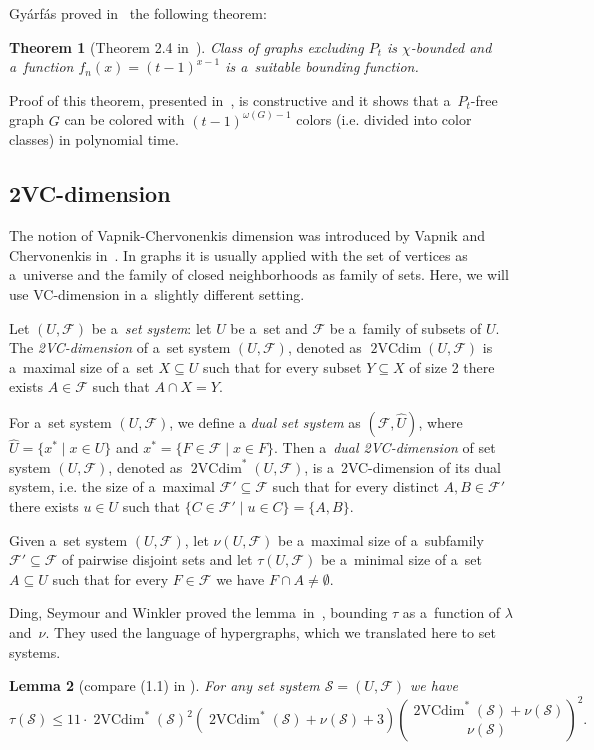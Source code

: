 \documentclass[11pt,a4paper]{article}
\DeclareMathOperator{\VC}{2VCdim}
\newtheorem{theorem}{Theorem}[section]
\newtheorem{lemma}[theorem]{Lemma}
\theoremstyle{definition}
\renewcommand{\varnothing}{\emptyset}
\begin{document}
Gyárfás proved in~\cite{chiBoundness} the following theorem:
\begin{theorem}[Theorem 2.4 in~\cite{chiBoundness}]\label{thm:Gyarfas_paths}
    Class of graphs excluding $P_t$ is $\chi$-bounded and a~function $f_n(x)= (t-1)^{x-1}$ is a~suitable bounding function. 
\end{theorem}

Proof of this theorem, presented in~\cite{chiBoundness}, is constructive and it shows that a~$P_t$-free graph $G$ can be colored with $(t-1)^{\omega(G)-1}$ colors (i.e. divided into color classes) in polynomial time.


\subsection{2VC-dimension}

The notion of  Vapnik-Chervonenkis dimension was introduced by Vapnik and Chervonenkis in~\cite{VC}. In graphs it is usually applied with the set of vertices as a~universe and the family of closed neighborhoods as family of sets. Here, we will use VC-dimension in a~slightly different setting. 

Let $(U, \mathcal{F})$ be a~{\it set system}: let $U$ be a~set and $\mathcal{F}$ be a~family of subsets of $U$. The {\it 2VC-dimension} of a~set system $(U,\mathcal{F})$, denoted as $\VC(U, \mathcal{F})$ is a~maximal size of a~set $X\subseteq U$ such that for every subset $Y\subseteq X$ of size 2 there exists $A\in\mathcal{F}$ such that $A\cap X = Y$. 

For a~set system $(U, \mathcal{F})$, we define a {\it dual set system} as $(\mathcal{F}, \widehat{U})$, where $\widehat{U} = \{x^*\mid x\in U\}$ and $x^* = \{F\in\mathcal{F}\mid x\in F\}$. Then a~{\it dual 2VC-dimension} of set system $(U,\mathcal{F})$, denoted as $\VC^*(U,\mathcal{F})$,  is a~2VC-dimension of its dual system, i.e. the size of a~maximal $\mathcal{F}'\subseteq \mathcal{F}$ such that for every distinct $A,B\in \mathcal{F}'$ there exists $u\in U$ such that $\{C\in \mathcal{F}'\mid u\in C\}=\{A,B\}$. 

Given a~set system $(U, \mathcal{F})$, let $\nu(U, \mathcal{F})$ be a~maximal size of a~subfamily $\mathcal{F}'\subseteq \mathcal{F}$ of pairwise disjoint sets and let $\tau(U, \mathcal{F})$ be a~minimal size of a~set $A\subseteq U$ such that for every $F\in \mathcal{F}$ we have $F\cap A\neq \varnothing$.

Ding, Seymour and Winkler proved the lemma~in~\cite{DSW}, bounding $\tau$ as a~function of $\lambda$ and~$\nu$. They used the language of hypergraphs, which we translated here to set systems. 
\begin{lemma}[compare (1.1) in \cite{DSW}]\label{lem:DSW}
    For any set system $\mathcal{S}=(U, \mathcal{F})$ we have $$\tau(\mathcal{S})\leq 11 \cdot \VC^*(\mathcal{S})^2\left(\VC^*(\mathcal{S}) + \nu(\mathcal{S}) + 3\right){{\VC^*(\mathcal{S}) + \nu(\mathcal{S})}\choose{\nu(\mathcal{S})}}^2.$$
\end{lemma}
\end{document}
